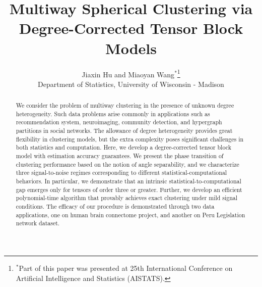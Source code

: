 \documentclass[lettersize,onecolumn,journal]{IEEEtran}
\theoremstyle{definition}
\theoremstyle{definition}
\begin{document}
\title{Multiway Spherical Clustering via \\ Degree-Corrected Tensor Block Models}

\author{ Jiaxin Hu and Miaoyan Wang$^*$\thanks{$^*$Part of this paper was presented at 25th International Conference on Artificial Intelligence and Statistics (AISTATS).}\\
Department of Statistics, University of Wisconsin - Madison
}



\maketitle

\begin{abstract}
We consider the problem of multiway clustering in the presence of unknown degree heterogeneity. Such data problems arise commonly in applications such as recommendation system, neuroimaging, community detection, and hypergraph partitions in social networks. The allowance of degree heterogeneity provides great flexibility in clustering models, but the extra complexity poses significant challenges in both statistics and computation. Here, we develop a degree-corrected tensor block model with estimation accuracy guarantees. We present the phase transition of clustering performance based on the notion of angle separability, and we characterize three signal-to-noise regimes corresponding to different statistical-computational behaviors. In particular, we demonstrate that an intrinsic statistical-to-computational gap emerges only for tensors of order three or greater. Further, we develop an efficient polynomial-time algorithm that provably achieves exact clustering under mild signal conditions. The efficacy of our procedure is demonstrated through two data applications, one on human brain connectome project, and another on Peru Legislation network dataset. 
\end{abstract}
\end{document}
